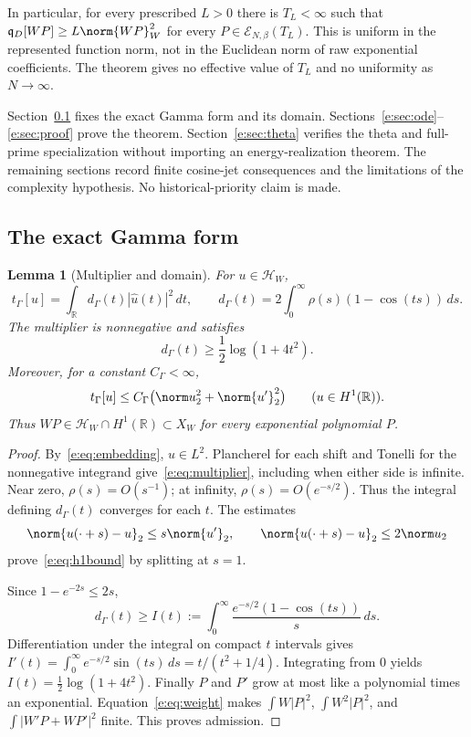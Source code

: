 \documentclass[11pt,a4paper]{article}
\numberwithin{equation}{section}
\newtheorem{lemma}[theorem]{Lemma}
\theoremstyle{definition}\newtheorem{definition}[theorem]{Definition}
\theoremstyle{remark}\newtheorem{remark}[theorem]{Remark}
\newcommand{\R}{\mathbb R}\newcommand{\C}{\mathbb C}\newcommand{\N}{\mathbb N}
\newcommand{\HH}{\mathcal H_W}\newcommand{\XX}{X_W}\newcommand{\EE}{\mathcal E_{N,\beta}}
\newcommand{\tg}{t_\Gamma}\newcommand{\cg}{c_\Gamma}
\newcommand{\qD}{\mathfrak q_D}\newcommand{\qth}{\mathfrak q_\theta}
\begin{document}
In particular, for every prescribed $L>0$ there is $T_L<\infty$ such that
$\qD[WP]\ge L\norm{WP}_W^2$ for every $P\in\EE(T_L)$.
This is uniform in the represented function norm, not in the Euclidean
norm of raw exponential coefficients. The theorem gives no effective
value of $T_L$ and no uniformity as $N\to\infty$.

Section~\ref{e:sec:gamma} fixes the exact Gamma form and its domain.
Sections~\ref{e:sec:ode}--\ref{e:sec:proof} prove the theorem.
Section~\ref{e:sec:theta} verifies the theta and full-prime specialization
without importing an energy-realization theorem. The remaining sections
record finite cosine-jet consequences and the limitations of the
complexity hypothesis. No historical-priority claim is made.


\subsection{The exact Gamma form}\label{e:sec:gamma}

\begin{lemma}[Multiplier and domain]\label{e:lem:gamma}
For $u\in\HH$,
\begin{equation}\label{e:eq:multiplier}
 \tg[u]=\int_\R d_\Gamma(t)|\widehat u(t)|^2\,dt,
 \qquad
 d_\Gamma(t)=2\int_0^\infty\rho(s)(1-\cos(ts))\,ds.
\end{equation}
The multiplier is nonnegative and satisfies
\begin{equation}\label{e:eq:logbound}
 d_\Gamma(t)\ge\frac12\log(1+4t^2).
\end{equation}
Moreover, for a constant $C_\Gamma<\infty$,
\begin{equation}\label{e:eq:h1bound}
 \tg[u]\le C_\Gamma\bigl(\norm u_2^2+\norm{u'}_2^2\bigr)
 \qquad(u\in H^1(\R)).
\end{equation}
Thus $WP\in\HH\cap H^1(\R)\subset\XX$ for every exponential polynomial
$P$.
\end{lemma}
\begin{proof}
By~\eqref{e:eq:embedding}, $u\in L^2$. Plancherel for each shift and Tonelli
for the nonnegative integrand give~\eqref{e:eq:multiplier}, including when
either side is infinite. Near zero, $\rho(s)=O(s^{-1})$; at infinity,
$\rho(s)=O(e^{-s/2})$. Thus the integral defining $d_\Gamma(t)$ converges
for each $t$. The estimates
\[
 \norm{u(\cdot+s)-u}_2\le s\norm{u'}_2,
 \qquad \norm{u(\cdot+s)-u}_2\le2\norm u_2
\]
prove~\eqref{e:eq:h1bound} by splitting at $s=1$.

Since $1-e^{-2s}\le2s$,
\[
 d_\Gamma(t)\ge I(t):=\int_0^\infty
 \frac{e^{-s/2}(1-\cos(ts))}{s}\,ds.
\]
Differentiation under the integral on compact $t$ intervals gives
$I'(t)=\int_0^\infty e^{-s/2}\sin(ts)\,ds=t/(t^2+1/4)$.
Integrating from $0$ yields $I(t)=\tfrac12\log(1+4t^2)$.
Finally $P$ and $P'$ grow at most like a polynomial times an exponential.
Equation~\eqref{e:eq:weight} makes
$\int W|P|^2$, $\int W^2|P|^2$, and
$\int |W'P+WP'|^2$ finite. This proves admission.
\end{proof}
\end{document}
